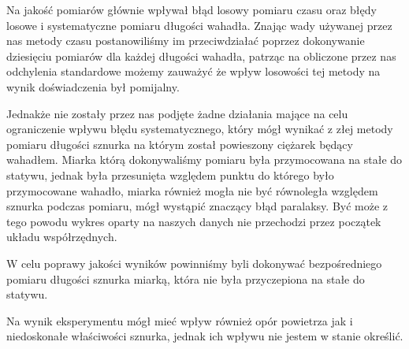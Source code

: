 \documentclass[a4paper,12pt]{article}
\begin{document}
Na jakość pomiarów głównie wpływał błąd losowy pomiaru czasu oraz błędy losowe i systematyczne pomiaru długości wahadła. Znając
wady używanej przez nas metody czasu postanowiliśmy im przeciwdziałać poprzez dokonywanie dziesięciu pomiarów dla każdej
długości wahadła, patrząc na obliczone przez nas odchylenia standardowe możemy zauważyć że wpływ losowości tej metody na wynik
doświadczenia był pomijalny.

Jednakże nie zostały przez nas podjęte żadne działania mające na celu ograniczenie wpływu błędu systematycznego, który mógł wynikać
z złej metody pomiaru długości sznurka na którym został powieszony ciężarek będący wahadłem. Miarka którą dokonywaliśmy pomiaru była
przymocowana na stałe do statywu, jednak była przesunięta względem punktu do którego było przymocowane wahadło, miarka również
mogła nie być równoległa względem sznurka podczas pomiaru, mógł wystąpić znaczący błąd paralaksy. Być może z tego powodu wykres
oparty na naszych danych nie przechodzi przez początek układu współrzędnych.

W celu poprawy jakości wyników powinniśmy byli dokonywać bezpośredniego pomiaru długości sznurka miarką, która nie była przyczepiona
na stałe do statywu.

Na wynik eksperymentu mógł mieć wpływ również opór powietrza jak i niedoskonałe właściwości sznurka, jednak ich wpływu nie jestem w
stanie określić.
\listoftables
\listoffigures
\end{document}
